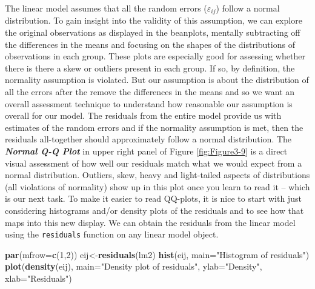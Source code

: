 \documentclass[]{book}
\newenvironment{Shaded}{\begin{snugshade}}{\end{snugshade}}
\newcommand{\KeywordTok}[1]{\textcolor[rgb]{0.13,0.29,0.53}{\textbf{#1}}}
\newcommand{\DataTypeTok}[1]{\textcolor[rgb]{0.13,0.29,0.53}{#1}}
\newcommand{\DecValTok}[1]{\textcolor[rgb]{0.00,0.00,0.81}{#1}}
\newcommand{\StringTok}[1]{\textcolor[rgb]{0.31,0.60,0.02}{#1}}
\newcommand{\NormalTok}[1]{#1}
\theoremstyle{definition}
\theoremstyle{definition}
\theoremstyle{remark}
\begin{document}
The linear model assumes that all the random errors
(\(\varepsilon_{ij}\)) follow a normal distribution. To gain insight
into the validity of this assumption, we can explore the original
observations as displayed in the beanplots, mentally subtracting off the
differences in the means and focusing on the shapes of the distributions
of observations in each group. These plots are especially good for
assessing whether there is there a skew or outliers present in each
group. If so, by definition, the normality assumption is violated. But
our assumption is about the distribution of all the errors after the
remove the differences in the means and so we want an overall assessment
technique to understand how reasonable our assumption is overall for our
model. The residuals from the entire model provide us with estimates of
the random errors and if the normality assumption is met, then the
residuals all-together should approximately follow a normal
distribution. The \textbf{\emph{Normal Q-Q Plot}} in upper right panel
of Figure \ref{fig:Figure3-9} is a direct visual assessment of how well
our residuals match what we would expect from a normal distribution.
Outliers, skew, heavy and light-tailed aspects of distributions (all
violations of normality) show up in this plot once you learn to read it
-- which is our next task. To make it easier to read QQ-plots, it is
nice to start with just considering histograms and/or density plots of
the residuals and to see how that maps into this new display. We can
obtain the residuals from the linear model using the \texttt{residuals}
function on any linear model object.




\begin{Shaded}
\begin{Highlighting}[]
\KeywordTok{par}\NormalTok{(}\DataTypeTok{mfrow=}\KeywordTok{c}\NormalTok{(}\DecValTok{1}\NormalTok{,}\DecValTok{2}\NormalTok{))}
\NormalTok{eij<-}\KeywordTok{residuals}\NormalTok{(lm2)}
\KeywordTok{hist}\NormalTok{(eij, }\DataTypeTok{main=}\StringTok{"Histogram of residuals"}\NormalTok{)}
\KeywordTok{plot}\NormalTok{(}\KeywordTok{density}\NormalTok{(eij), }\DataTypeTok{main=}\StringTok{"Density plot of residuals"}\NormalTok{, }\DataTypeTok{ylab=}\StringTok{"Density"}\NormalTok{,}
     \DataTypeTok{xlab=}\StringTok{"Residuals"}\NormalTok{)}
\end{Highlighting}
\end{Shaded}
\end{document}
